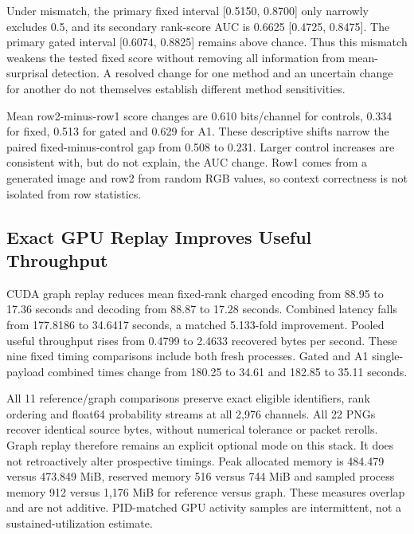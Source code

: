Under mismatch, the primary fixed interval [0.5150, 0.8700] only narrowly excludes 0.5, and its secondary rank-score AUC is 0.6625 [0.4725, 0.8475]. The primary gated interval [0.6074, 0.8825] remains above chance. Thus this mismatch weakens the tested fixed score without removing all information from mean-surprisal detection. A resolved change for one method and an uncertain change for another do not themselves establish different method sensitivities.

Mean row2-minus-row1 score changes are 0.610 bits/channel for controls, 0.334 for fixed, 0.513 for gated and 0.629 for A1. These descriptive shifts narrow the paired fixed-minus-control gap from 0.508 to 0.231. Larger control increases are consistent with, but do not explain, the AUC change. Row1 comes from a generated image and row2 from random RGB values, so context correctness is not isolated from row statistics.

\subsection{Exact GPU Replay Improves Useful Throughput}
CUDA graph replay reduces mean fixed-rank charged encoding from 88.95 to 17.36 seconds and decoding from 88.87 to 17.28 seconds. Combined latency falls from 177.8186 to 34.6417 seconds, a matched 5.133-fold improvement. Pooled useful throughput rises from 0.4799 to 2.4633 recovered bytes per second. These nine fixed timing comparisons include both fresh processes. Gated and A1 single-payload combined times change from 180.25 to 34.61 and 182.85 to 35.11 seconds.

All 11 reference/graph comparisons preserve exact eligible identifiers, rank ordering and float64 probability streams at all 2,976 channels. All 22 PNGs recover identical source bytes, without numerical tolerance or packet rerolls. Graph replay therefore remains an explicit optional mode on this stack. It does not retroactively alter prospective timings. Peak allocated memory is 484.479 versus 473.849 MiB, reserved memory 516 versus 744 MiB and sampled process memory 912 versus 1,176 MiB for reference versus graph. These measures overlap and are not additive. PID-matched GPU activity samples are intermittent, not a sustained-utilization estimate.

